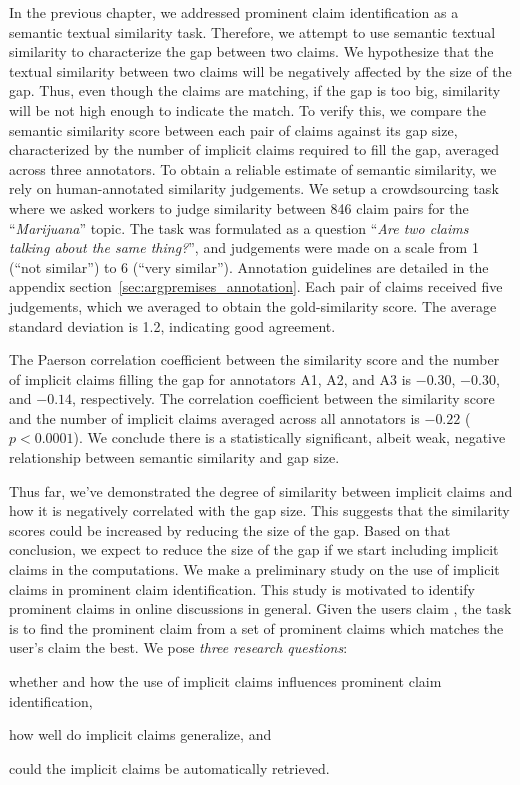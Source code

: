 In the previous chapter, we addressed prominent claim identification as a semantic
textual similarity task. 
Therefore, we attempt to use semantic textual similarity to characterize the gap
between two claims. 
We hypothesize that the textual similarity between two claims will be
negatively affected by the size of the gap. 
Thus, even though the claims are matching, if the gap is too big, similarity will be not 
high enough to indicate the match. 
To verify this, we compare the semantic similarity score between each pair of 
claims against its gap size, characterized by the number of implicit claims
required to fill the gap, 
averaged across three annotators. 
To obtain a reliable estimate of semantic similarity, we rely on human-annotated 
similarity judgements. 
We setup a crowdsourcing task where we asked workers to judge similarity
between 846 claim pairs for the ``\emph{Marijuana}'' topic. 
The task was formulated as a question ``\emph{Are two claims
talking about the same thing?}'', and judgements were made on a scale
from 1 (``not similar'') to 6 (``very similar''). 
Annotation guidelines are detailed in the appendix
section~\ref{sec:argpremises_annotation}. 
Each pair of claims received five judgements, which we averaged to obtain the
gold-similarity score. 
The average standard deviation is 1.2, indicating good agreement. 

The Paerson correlation coefficient  between the similarity score and the
number of implicit claims filling the gap for annotators A1, A2, and A3 is
$-0.30$, $-0.30$, and $-0.14$, respectively.  The correlation coefficient between the
similarity score and the number of implicit claims averaged across all annotators is
$-0.22$ ($p < 0.0001$).  We conclude there is a statistically significant,
albeit weak, negative relationship between semantic similarity and gap size. 

Thus far, we've demonstrated the degree of similarity between implicit 
claims and how it is negatively correlated with the gap size. 
This suggests that the similarity scores could be increased by reducing the size 
of the gap.
Based on that conclusion, we expect to reduce the size of the gap if we start
including implicit claims in the computations. 
We make a preliminary study on the use of implicit claims in prominent claim
identification.
This study is motivated to identify prominent claims in online discussions in
general.
Given the users claim , the task is to find the prominent claim from a set of 
prominent claims which matches the user's claim the best. 
We pose \emph{three research questions}: 
\begin{enumerate*}[label=(\arabic*)]
\item whether and how the use of implicit claims influences prominent claim identification, 
\item how well do implicit claims generalize, and 
\item could the implicit claims be automatically retrieved.
\end{enumerate*}


